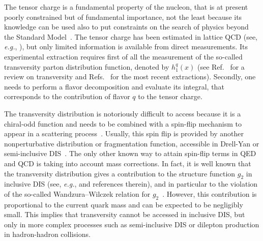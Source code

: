 \documentclass[preprintnumbers,floatfix,nofootinbib]{revtex4}
\newcommand{\eg}{{\em e.g.}}
\begin{document}
The tensor charge is a fundamental property of the nucleon, that is at
present poorly constrained but of fundamental importance, not the least because its knowledge can be used also to put constraints on the search of physics beyond the Standard Model~\cite{Cirigliano:2013xha,Bhattacharya:2015esa,Courtoy:2015haa}.
The tensor charge has been estimated in lattice QCD (see, \eg,
\cite{Green:2012ej,Bali:2014nma,Bhattacharya:2015wna,Abdel-Rehim:2015owa,Bhattacharya:2016zcn}), but
only limited information is available from direct measurements. Its experimental extraction requires first of all the measurement of the so-called transversity parton distribution function,
denoted by $h_1^q(x)$ (see Ref.~\cite{Barone:2001sp} for a review on transversity and
Refs.~\cite{Radici:2015mwa,Anselmino:2015sxa,Kang:2015msa} for the most recent
extractions). Secondly, one needs to perform a flavor decomposition and evaluate its integral, that corresponds to the contribution of flavor $q$ to the tensor charge. 

The transversity distribution is notoriously difficult to access because it is
a chiral-odd function and needs to be combined with a spin-flip mechanism to
appear in a scattering process~\cite{Jaffe:1996zw}. Usually, this spin flip is provided by another
nonperturbative distribution or fragmentation function, accessible in Drell-Yan or semi-inclusive DIS~\cite{Ralston:1979ys,Jaffe:1991kp,Jaffe:1993xb,Collins:1992kk}.
The only other known way to attain spin-flip terms in QED and QCD is taking into
account mass corrections. In fact, it is well known that the transversity distribution gives a
contribution to the structure function $g_2$ in inclusive DIS (see, \eg,
\cite{Accardi:2009au} and references therein), and in
particular to the violation of the so-called Wandzura--Wilczek relation for
$g_2$~\cite{Wandzura:1977qf}. However, this contribution is proportional to the current quark mass and can be expected to be negligibly small. This implies that
transversity cannot be accessed in inclusive DIS, but only in more complex processes such as semi-inclusive DIS or dilepton production in hadron-hadron collisions.
\end{document}
